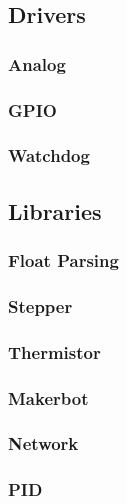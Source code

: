 		\subsection{Drivers}
			
			\subsubsection{Analog}
			
			\subsubsection{GPIO}
			
			\subsubsection{Watchdog}
			
		\subsection{Libraries}
			
			\subsubsection{Float Parsing}
			
			\subsubsection{Stepper}
			
			\subsubsection{Thermistor}
			
			\subsubsection{Makerbot}
			
			\subsubsection{Network}
			
			\subsubsection{PID}
